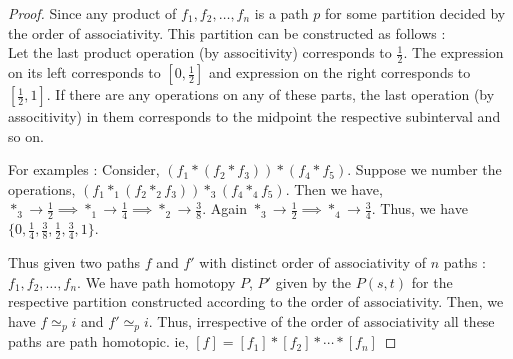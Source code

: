 \begin{proof}
	Since any product of $f_1, f_2, \dots, f_n$ is a path $p$ for some partition decided by the order of associativity.
	This partition can be constructed as follows :\\
	Let the last product operation (by associtivity) corresponds to $\frac{1}{2}$.
	The expression on its left corresponds to $[0,\frac{1}{2}]$ and expression on the right corresponds to $[\frac{1}{2},1]$.
	If there are any operations on any of these parts, the last operation (by associtivity) in them corresponds to the midpoint the respective subinterval and so on.\\

\begin{commentary}
	For examples : Consider, $(f_1 \ast ( f_2 \ast f_3)) \ast (f_4 \ast f_5)$.
	Suppose we number the operations, $(f_1 \ast_1 ( f_2 \ast_2 f_3)) \ast_3 (f_4 \ast_4 f_5)$.
	Then we have,  $\ast_3 \to \frac{1}{2} \implies \ast_1 \to \frac{1}{4} \implies \ast_2 \to \frac{3}{8}$.
	Again $\ast_3 \to \frac{1}{2} \implies \ast_4 \to \frac{3}{4}$.
	Thus, we have $\{0, \frac{1}{4}, \frac{3}{8}, \frac{1}{2}, \frac{3}{4},1 \}$.\\
\end{commentary}
	
	Thus given two paths $f$ and $f'$ with distinct order of associativity of $n$ paths : $f_1, f_2, \dots, f_n$.
	We have path homotopy $P$, $P'$ given by the $P(s,t)$ for the respective partition constructed according to the order of associativity.
	Then, we have $f \simeq_p i$ and $f' \simeq_p i$.
	Thus, irrespective of the order of associativity all these paths are path homotopic.
	ie, $[f] = [f_1] \ast [f_2] \ast \dotsb \ast [f_n]$
\end{proof}

